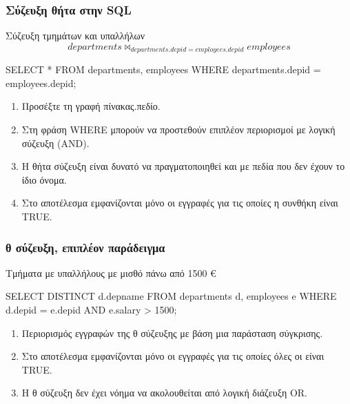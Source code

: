 \begin{frame}
\frametitle{Σύζευξη θήτα στην {\en SQL}}
\begin{minipage}{\wE}
\vspace*{-0.5cm}
\begin{exampleblock}{Σύζευξη τμημάτων και υπαλλήλων}
\[ departments \bowtie_{departments.depid = employees.depid} employees \]
\vspace*{-0.5cm}
\en
\begin{SQL}
  SELECT *
    FROM departments, employees
   WHERE departments.depid = employees.depid;
\end{SQL}
\el
\end{exampleblock}
\pause
\begin{enumerate} %
  \item Προσέξτε τη γραφή {\bb πίνακας.πεδίο}.
  \item Στη φράση {\sq WHERE} μπορούν να προστεθούν   επιπλέον
        περιορισμοί με λογική σύζευξη ({\sq AND}).
  \item Η θήτα σύζευξη είναι δυνατό να πραγματοποιηθεί  και με πεδία
        που δεν έχουν το ίδιο όνομα.
  \item Στο αποτέλεσμα εμφανίζονται μόνο οι εγγραφές για τις οποίες η συνθήκη είναι {\sq TRUE}.      
\end{enumerate}
\end{minipage}
\end{frame}



\begin{frame}
\frametitle{θ σύζευξη, επιπλέον παράδειγμα}
\begin{minipage}{\wE}
\begin{exampleblock}{Τμήματα με υπαλλήλους με μισθό πάνω από 1500 \euro}
\en
\begin{SQL}
  SELECT DISTINCT d.depname
    FROM departments d, employees e
   WHERE d.depid = e.depid
     AND e.salary > 1500;
\end{SQL}
\el
\end{exampleblock}
\pause
\begin{enumerate} %
  \item Περιορισμός εγγραφών της θ σύζευξης με βάση μια παράσταση σύγκρισης.
  \item Στο αποτέλεσμα εμφανίζονται μόνο οι εγγραφές για τις οποίες όλες οι είναι {\sq TRUE}.
  \item Η θ σύζευξη δεν έχει νόημα να ακολουθείται από λογική διάζευξη {\sq OR}.  
\end{enumerate}
\end{minipage}
\end{frame}


